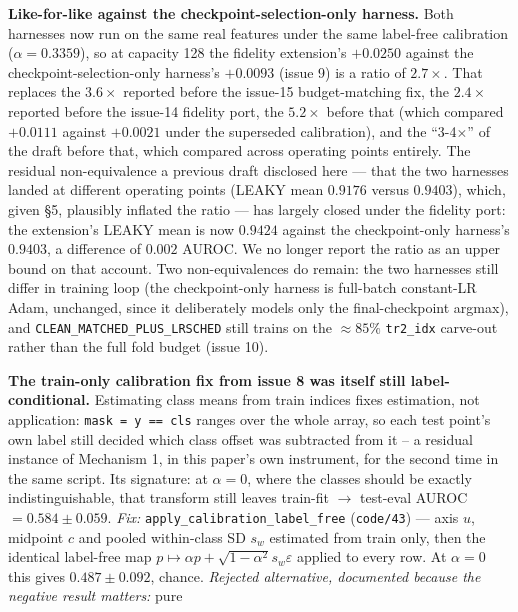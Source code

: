 \documentclass[10pt]{article} %
\begin{document}
\begin{description}
  \textbf{Like-for-like against the checkpoint-selection-only harness.}
  Both harnesses now run on the same real features under the same
  label-free calibration ($\alpha=0.3359$), so at capacity 128 the fidelity
  extension's $+0.0250$ against the checkpoint-selection-only harness's
  $+0.0093$ (issue 9) is a ratio of $\mathbf{2.7\times}$. That replaces the
  $3.6\times$ reported before the issue-15 budget-matching fix, the
  $2.4\times$ reported before the issue-14 fidelity port, the
  $5.2\times$ before that (which compared $+0.0111$ against
  $+0.0021$ under the superseded calibration), and the ``3-4$\times$'' of
  the draft before that, which compared across operating points
  entirely. The residual non-equivalence a previous draft disclosed here
  --- that the two harnesses landed at different operating points (LEAKY
  mean $0.9176$ versus $0.9403$), which, given §5, plausibly inflated the
  ratio --- has largely closed under the fidelity port: the extension's
  LEAKY mean is now $0.9424$ against the checkpoint-only harness's
  $0.9403$, a difference of $0.002$ AUROC. We no longer report the ratio
  as an upper bound on that account. Two non-equivalences do remain: the two
  harnesses still differ in training loop (the checkpoint-only harness is
  full-batch constant-LR Adam, unchanged, since it deliberately models only
  the final-checkpoint argmax), and \texttt{CLEAN\_MATCHED\_PLUS\_LRSCHED}
  still trains on the $\approx85\%$ \texttt{tr2\_idx} carve-out rather than
  the full fold budget (issue 10).
\item[13.] \textbf{The train-only calibration fix from issue 8 was itself
  still label-conditional.} Estimating class means from train indices
  fixes estimation, not application: \texttt{mask = y == cls} ranges over
  the whole array, so each test point's own label still decided which
  class offset was subtracted from it -- a residual instance of
  Mechanism 1, in this paper's own instrument, for the second time in the
  same script. Its signature: at $\alpha=0$, where the classes should be
  exactly indistinguishable, that transform still leaves train-fit
  $\rightarrow$ test-eval AUROC $=0.584\pm0.059$. \textit{Fix:}
  \texttt{apply\_calibration\_label\_free} (\texttt{code/43}) --- axis $u$,
  midpoint $c$ and pooled within-class SD $s_w$ estimated from train
  only, then the identical label-free map
  $p\mapsto\alpha p+\sqrt{1-\alpha^2}s_w\varepsilon$ applied to every
  row. At $\alpha=0$ this gives $0.487\pm0.092$, chance. \textit{Rejected
  alternative, documented because the negative result matters:} pure

\end{description}
\end{document}
